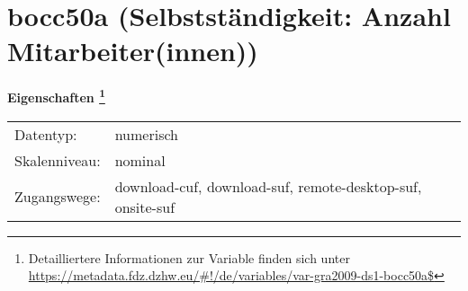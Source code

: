 
    \setcounter{footnote}{0}

    \vspace*{-1.8cm}
	\section{bocc50a (Selbstständigkeit: Anzahl Mitarbeiter(innen))}
	\label{section:bocc50a}



    \vspace*{0.5cm}
    \noindent\textbf{Eigenschaften
	\footnote{Detailliertere Informationen zur Variable finden sich unter
		\url{https://metadata.fdz.dzhw.eu/\#!/de/variables/var-gra2009-ds1-bocc50a$}}}\\
	\begin{tabularx}{\hsize}{@{}lX}
	Datentyp: & numerisch \\
	Skalenniveau: & nominal \\
	Zugangswege: &
	  download-cuf, 
	  download-suf, 
	  remote-desktop-suf, 
	  onsite-suf
 \\
    \end{tabularx}



